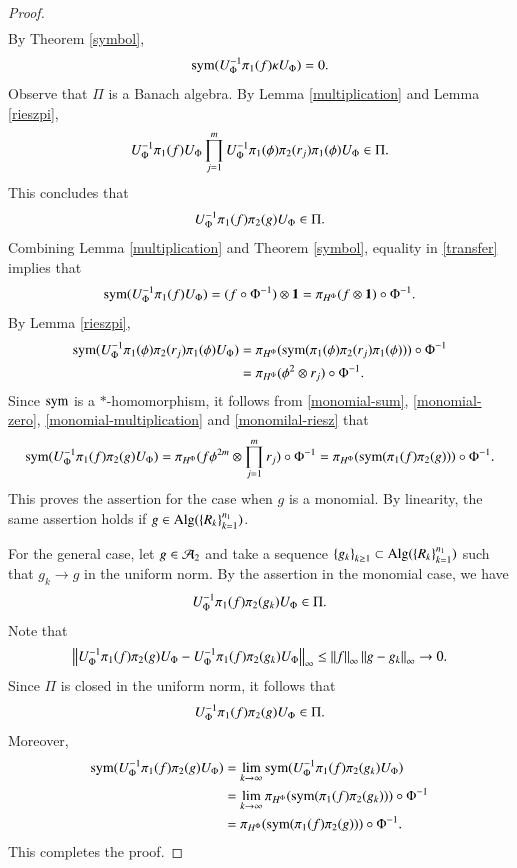 \documentclass[leqno]{amsart}
\begin{document}
\begin{proof}
\begin{align*}
		\end{align*}
		By Theorem \ref{symbol},
		\begin{align}\label{monomial-zero}
			{\rm sym}(U_{\Phi}^{-1}\pi_{1}(f)\kappa U_{\Phi})=0.
		\end{align}
		Observe that $\Pi$ is a Banach algebra.
		By  Lemma \ref{multiplication} and  Lemma \ref{rieszpi},
		\begin{align*}
			U_{\Phi}^{-1}\pi_{1}(f)U_{\Phi}\prod_{j=1}^{m}U_{\Phi}^{-1}\pi_{1}(\phi)\pi_{2}(r_{j})\pi_{1}(\phi)U_{\Phi}\in\Pi.
		\end{align*}
		This concludes that $$U_{\Phi}^{-1} \pi_{1}(f)\pi_{2}(g)U_{\Phi}\in\Pi.$$
		Combining Lemma \ref{multiplication} and  Theorem \ref{symbol}, equality in \eqref{transfer} implies that
		\begin{align}\label{monomial-multiplication}
			{\rm sym}(U_{\Phi}^{-1}\pi_{1}(f)U_{\Phi})=(f\circ \Phi^{-1}) \otimes\mathbf 1=\pi_{H^{\Phi}}(f\otimes\mathbf 1)\circ\Phi^{-1}.
		\end{align}
		By Lemma \ref{rieszpi}, 
		\begin{align}\label{monomilal-riesz}
			{\rm sym}(U_{\Phi}^{-1}\pi_{1}(\phi)\pi_{2}(r_{j})\pi_{1}(\phi)U_{\Phi})
			&=\pi_{H^{\Phi}}({\rm sym}(\pi_{1}(\phi)\pi_{2}(r_{j})\pi_{1}(\phi)))\circ\Phi^{-1}\\
			\nonumber&=\pi_{H^{\Phi}}(\phi^{2}\otimes r_{j})\circ\Phi^{-1}.
		\end{align}
		Since ${\rm sym}$ is a $*$-homomorphism, it follows from \eqref{monomial-sum}, \eqref{monomial-zero}, \eqref{monomial-multiplication} and \eqref{monomilal-riesz} that
		\begin{align*}
			{\rm sym}(U_{\Phi}^{-1} \pi_{1}(f)\pi_{2}(g)U_{\Phi})
			=\pi_{H^{\Phi}}(f\phi^{2m}\otimes \prod_{j=1}^{m}r_{j})\circ\Phi^{-1}
			=\pi_{H^{\Phi}}({\rm sym}(\pi_{1}(f)\pi_{2}(g)))\circ\Phi^{-1}.
		\end{align*}
		This proves the assertion for the case when $g$ is a monomial. 
		By linearity, the same assertion holds if $g\in{\rm Alg}(\left\{ R_{k} \right\}_{k=1}^{n_{1}})$.
		
		For the general case, let $g\in{\mathcal A}_{2}$ and take a sequence $\left\{ g_{k} \right\}_{k\geq1}\subset{\rm Alg}(\left\{ R_{k} \right\}_{k=1}^{n_{1}})$ such that $g_{k}\rightarrow g$ in the uniform norm.
		By the assertion in the monomial case, we have
		$$U_{\Phi}^{-1} \pi_{1}(f)\pi_{2}(g_{k})U_{\Phi}\in\Pi.$$
		Note that
		\begin{align*}
			\left\| U_{\Phi}^{-1} \pi_{1}(f)\pi_{2}(g)U_{\Phi}-U_{\Phi}^{-1} \pi_{1}(f)\pi_{2}(g_{k})U_{\Phi} \right\|_{\infty}
			\leq\left\| f \right\|_{\infty}\left\| g-g_{k} \right\|_{\infty}\rightarrow0.
		\end{align*}
		Since $\Pi$ is closed in the uniform norm, it follows that
		\begin{align*}
			U_{\Phi}^{-1} \pi_{1}(f)\pi_{2}(g)U_{\Phi}\in\Pi.
		\end{align*}
		Moreover,
		\begin{align*}
			{\rm sym}(U_{\Phi}^{-1} \pi_{1}(f)\pi_{2}(g)U_{\Phi})&=\lim_{k\rightarrow\infty}{\rm sym}(U_{\Phi}^{-1} \pi_{1}(f)\pi_{2}(g_{k})U_{\Phi})\\
			&=\lim_{k\rightarrow\infty}\pi_{H^{\Phi}}({\rm sym}(\pi_{1}(f)\pi_{2}(g_{k})))\circ\Phi^{-1}\\
			&=\pi_{H^{\Phi}}({\rm sym}(\pi_{1}(f)\pi_{2}(g)))\circ\Phi^{-1}.
		\end{align*}
		This completes the proof.
	\end{proof}
	
\end{document}
